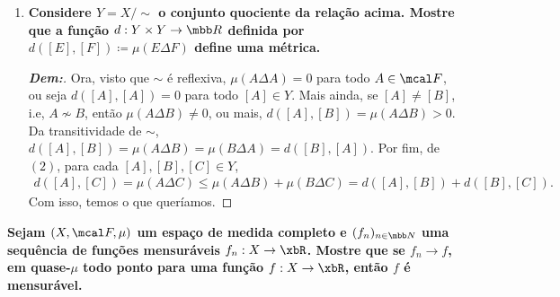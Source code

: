 \begin{enumerate}[label=(\alph*), wide, labelindent=0pt]
\begin{proof}[\textbf{Dem:}]
      \noindent 
      (Transitiva:) Sejam $A, B, C \in \mcal F$, vejamos que se $A\sim B$ e $B \sim C$, então $A \sim C$, ou seja,  
      $\mu (A\Delta C) = 0$. Note que, 
      \begin{align*}
        A\Delta C &= (A\cap C^C) \cup (C \cap A^C) = (A \cap C^C\cap(B \cup B^C)) \cup (C \cap A^C\cap(B \cup B^C))\\
        &=((A\cap C^C\cap B) \cup (A \cap C^C \cap B^C)) \cup ((C\cap A^C \cap B)\cup (C\cap A^C \cap B^C))\\
        &=((A\cap(B \setminus C))\cup(C^C\cap(A\setminus B)))\cup((C\cap(B\setminus A))\cup (A^C \cap (C \setminus B)))\\
        &\subseteq ((B\setminus C)\cup (A\setminus B))\cup ((B\setminus A) \cup (C\setminus B)) = (A\Delta B) \cup (B \Delta C).
      \end{align*}    
      Portanto, $\mu(A\Delta C) \le \mu((A\Delta B) \cup (B\Delta C)) $, $(2)$, ou seja 
      \begin{align*}
        0 \le \mu(A\Delta C) \le \mu((A\Delta B) \cup (B\Delta C)) \le \mu(A\Delta B) + \mu(B \Delta C) = 0 + 0 = 0,
      \end{align*}
      ou seja $\mu(A \Delta C) = 0$, isto é, $A \sim C$, como queríamos.
    \end{proof}
  \item \textbf{Considere $Y = X/\sim $ o conjunto quociente da 
    relação acima. Mostre que a função 
    $d: Y \times Y \rightarrow \mbb R$ definida por 
    $d([E], [F])\coloneq \mu(E \Delta F)$ define uma métrica.}
    \begin{proof}[\textbf{Dem:}]
      Ora, visto que $\sim$ é reflexiva, $\mu(A \Delta A) = 0$ para todo $A \in \mcal F$, ou seja $d([A], [A]) = 0$ para
      todo $[A] \in Y$. Mais ainda, se $[A] \neq [B]$, i.e, $A \not \sim B$, então $\mu(A\Delta B)\neq 0$, ou mais, 
      $d([A], [B]) = \mu(A \Delta B) > 0$. Da transitividade de $\sim$, $d([A], [B]) = \mu(A \Delta B) = 
      \mu(B \Delta A) = d([B], [A])$. Por fim,  de $(2)$, para cada $[A], [B], [C] \in Y$, 
      \begin{align*}
        d([A], [C]) = \mu(A \Delta C) \le \mu(A \Delta B) + \mu(B \Delta C) = d([A], [B]) + d([B], [C]).
      \end{align*}
      Com isso, temos o que queríamos.
    \end{proof}
\end{enumerate}
\biglinend
{}
\bigline 
\textbf{Sejam $(X, \mcal F, \mu)$ um espaço de medida completo e $(f_n)_{n \in \mbb N}$ uma sequência de funções mensuráveis 
$f_n: X \rightarrow \xbR$. Mostre que se $f_n \rightarrow f$, em quase-$\mu$ todo ponto para uma função 
$f: X \rightarrow \xbR$, então $f$ é mensurável.}
